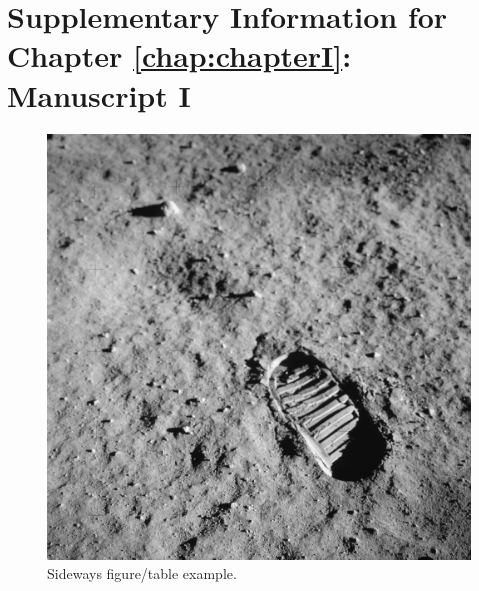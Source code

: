 \appendix
\chapter{Supplementary Information for Chapter \ref{chap:chapterI}: Manuscript I}
\label{appendix:chapter1}
\acresetall

\lipsum[1]

\clearpage
\begin{landscape}
\begin{figure}[t]
    \centering
    \captionsetup{width=1.22\textwidth}
    \includegraphics[height=0.85\textwidth]{figs/chapter1/astronaut_footprint.jpg}
    \caption{Sideways figure/table example.}
    \label{fig:chapter1:S1} 
\end{figure}
\end{landscape}


